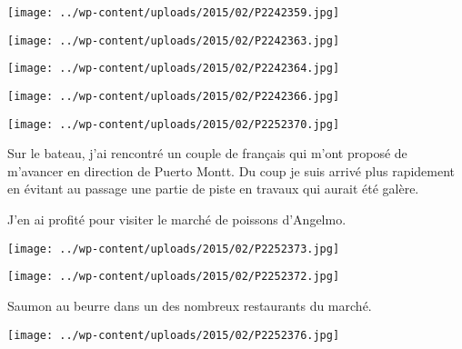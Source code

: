  

\begin{center} \texttt{[image: ../wp-content/uploads/2015/02/P2242359.jpg]} \end{center}

 

\begin{center} \texttt{[image: ../wp-content/uploads/2015/02/P2242363.jpg]} \end{center}

 

\begin{center} \texttt{[image: ../wp-content/uploads/2015/02/P2242364.jpg]} \end{center}

 

\begin{center} \texttt{[image: ../wp-content/uploads/2015/02/P2242366.jpg]} \end{center}

 

\begin{center} \texttt{[image: ../wp-content/uploads/2015/02/P2252370.jpg]} \end{center}

Sur le bateau, j'ai rencontré un couple de français qui m'ont proposé de m'avancer en direction de Puerto Montt. Du coup je suis arrivé plus rapidement en évitant au passage une partie de piste en travaux qui aurait été galère.

 J'en ai profité pour visiter le marché de poissons d'Angelmo.

 

\begin{center} \texttt{[image: ../wp-content/uploads/2015/02/P2252373.jpg]} \end{center}

 

\begin{center} \texttt{[image: ../wp-content/uploads/2015/02/P2252372.jpg]} \end{center}



 Saumon au beurre dans un des nombreux restaurants du marché.

 

\begin{center} \texttt{[image: ../wp-content/uploads/2015/02/P2252376.jpg]} \end{center}

